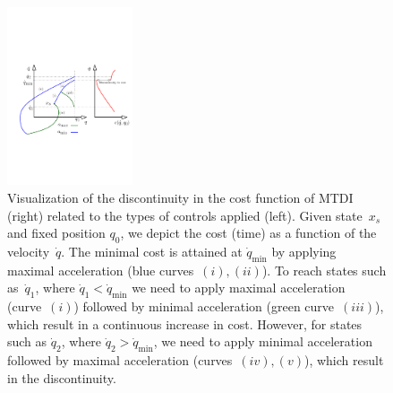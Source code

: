 \documentclass[letterpaper, 10 pt, conference]{ieeeconf}  %
\begin{document}
\begin{figure}[tb]
  \centering
  	\includegraphics[height = 5.25cm ]{fig/cost_discontinuity.pdf}
  \caption{
    \captionstyle
  	Visualization of the discontinuity in the cost function of MTDI (right) related to the types of controls applied (left). 
  	Given state~$x_s$ and fixed position $q_0$, we depict the cost (time) as a function of the velocity~$\dot{q}$. 
  	The minimal cost is attained at $\dot{q}_{\min}$ by applying maximal acceleration (blue curves~$(i), (ii)$). 
  	To reach states such as~$\dot{q}_1$, where $\dot{q}_1 < \dot{q}_{\min}$ we need to apply maximal acceleration (curve~$(i)$) followed by minimal acceleration (green curve~$(iii)$), which result in a continuous increase in cost.
  	However, for states such as $\dot{q}_2$, where $\dot{q}_2 > \dot{q}_{\min}$, we need to apply minimal acceleration  followed by maximal acceleration (curves~$(iv), (v)$), which result in the discontinuity.
  	}
   	\label{fig:discont}
\end{figure}
\end{document}
